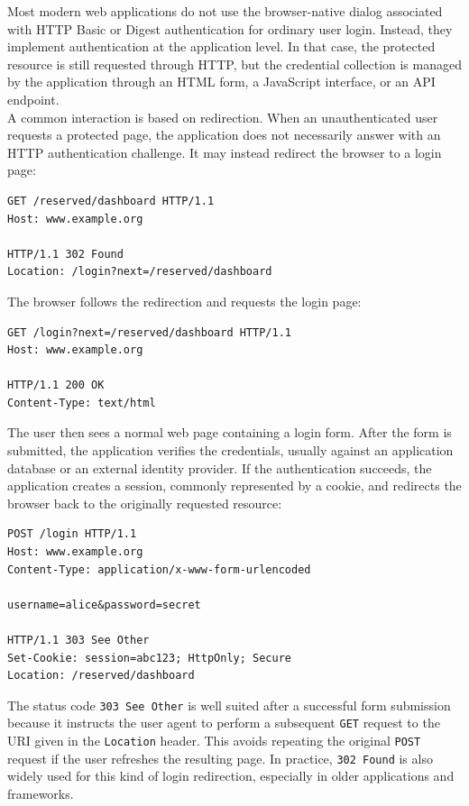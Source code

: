 \documentclass{scrbook}
\begin{document}
Most modern web applications do not use the browser-native dialog associated with HTTP Basic or Digest authentication for ordinary user login. Instead, they implement authentication at the application level. In that case, the protected resource is still requested through HTTP, but the credential collection is managed by the application through an HTML form, a JavaScript interface, or an API endpoint.\\

A common interaction is based on redirection. When an unauthenticated user requests a protected page, the application does not necessarily answer with an HTTP authentication challenge. It may instead redirect the browser to a login page:

\begin{lstlisting}
GET /reserved/dashboard HTTP/1.1
Host: www.example.org

HTTP/1.1 302 Found
Location: /login?next=/reserved/dashboard
\end{lstlisting}

The browser follows the redirection and requests the login page:

\begin{lstlisting}
GET /login?next=/reserved/dashboard HTTP/1.1
Host: www.example.org

HTTP/1.1 200 OK
Content-Type: text/html
\end{lstlisting}

The user then sees a normal web page containing a login form. After the form is submitted, the application verifies the credentials, usually against an application database or an external identity provider. If the authentication succeeds, the application creates a session, commonly represented by a cookie, and redirects the browser back to the originally requested resource:

\begin{lstlisting}
POST /login HTTP/1.1
Host: www.example.org
Content-Type: application/x-www-form-urlencoded

username=alice&password=secret

HTTP/1.1 303 See Other
Set-Cookie: session=abc123; HttpOnly; Secure
Location: /reserved/dashboard
\end{lstlisting}

The status code \texttt{303 See Other} is well suited after a successful form submission because it instructs the user agent to perform a subsequent \texttt{GET} request to the URI given in the \texttt{Location} header. This avoids repeating the original \texttt{POST} request if the user refreshes the resulting page. In practice, \texttt{302 Found} is also widely used for this kind of login redirection, especially in older applications and frameworks.\\
\end{document}
